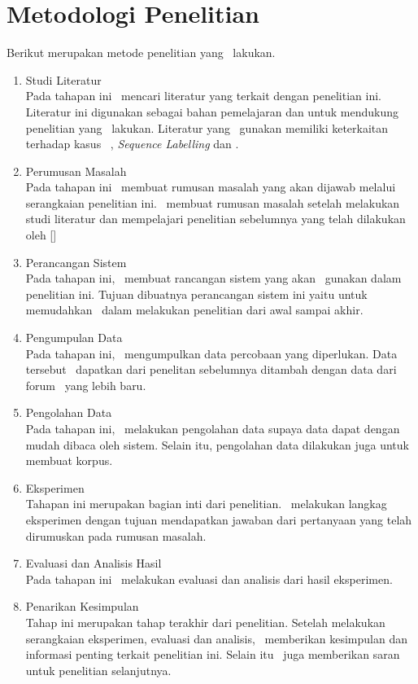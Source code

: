 \section{Metodologi Penelitian}
Berikut merupakan metode penelitian yang \saya~lakukan.
\begin{enumerate}
	\item Studi Literatur\\
	Pada tahapan ini \saya~mencari literatur yang terkait dengan penelitian ini. Literatur ini digunakan sebagai bahan pemelajaran dan untuk mendukung penelitian yang \saya~lakukan. Literatur yang \saya~gunakan memiliki keterkaitan terhadap kasus \mer~, \textit{Sequence Labelling} dan \rnn.
	
	\item Perumusan Masalah \\
	Pada tahapan ini \saya~membuat rumusan masalah yang akan dijawab melalui serangkaian penelitian ini. \saya~membuat rumusan masalah setelah melakukan studi literatur dan mempelajari penelitian sebelumnya yang telah dilakukan oleh []
	
	\item Perancangan Sistem \\
	Pada tahapan ini, \saya~membuat rancangan sistem yang akan \saya~gunakan dalam penelitian ini. Tujuan dibuatnya perancangan sistem ini yaitu untuk memudahkan \saya~dalam melakukan penelitian dari awal sampai akhir.
	
	\item Pengumpulan Data \\
	Pada tahapan ini, \saya~mengumpulkan data percobaan yang diperlukan. Data tersebut \saya~dapatkan dari penelitan sebelumnya ditambah dengan data dari forum \ol~yang lebih baru.
	
	\item Pengolahan Data \\
	Pada tahapan ini, \saya~melakukan pengolahan data supaya data dapat dengan mudah dibaca oleh sistem. Selain itu, pengolahan data dilakukan juga untuk membuat korpus.
		
	\item Eksperimen \\
	Tahapan ini merupakan bagian inti dari penelitian. \saya~melakukan langkag eksperimen dengan tujuan mendapatkan jawaban dari pertanyaan yang telah dirumuskan pada rumusan masalah.
	
	\item Evaluasi dan Analisis Hasil \\
	Pada tahapan ini \saya~melakukan evaluasi dan analisis dari hasil eksperimen.
		
	\item Penarikan Kesimpulan \\
	Tahap ini merupakan tahap terakhir dari penelitian. Setelah melakukan serangkaian eksperimen, evaluasi dan analisis, \saya~memberikan kesimpulan dan informasi penting terkait penelitian ini. Selain itu \saya~juga memberikan saran untuk penelitian selanjutnya.
\end{enumerate}

